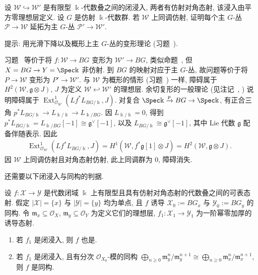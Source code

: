 \begin{exercise}\label{src:7.7.14}
设 $\mathcal W\hookrightarrow\mathcal W'$ 是有限型 $\Bbbk$-代数叠之间的闭浸入, 两者有仿射对角态射, 该浸入由平方零理想层定义. 设 $G$ 是仿射 $\Bbbk$-代数群. 若 $\mathcal W$ 上同调仿射, 证明每个主 $G$-丛 $\mathcal P\to\mathcal W$ 延拓为主 $G$-丛 $\mathcal P'\to\mathcal W'$.

提示: 用光滑下降以及概形上主 $G$-丛的变形理论 (习题~).
\end{exercise}
\begin{remark}\label{src:7.7.15}
习题~ 等价于将 $f:\mathcal W\to BG$ 变形为 $\mathcal W'\to BG$, 类似命题~, 但 $\mathcal X=BG\to\mathcal Y=\Spec\Bbbk$ 非仿射. 到 $BG$ 的映射对应于主 $G$-丛, 故问题等价于将 $P\to\mathcal W$ 变形为 $P'\to\mathcal W'$. 与 $\mathcal W$ 为概形的情形 (习题~) 一样, 障碍属于 $H^2(\mathcal W,\mathfrak g\otimes J)$, $J$ 为定义 $\mathcal W\hookleftarrow\mathcal W'$ 的理想层. 余切复形的一般理论 (见注记~, ) 说明障碍属于 $\operatorname{Ext}^1_{\mathcal O_{\mathcal W}}(Lf^*L_{BG/\Bbbk},J)$. 对复合 $\Spec\Bbbk\xrightarrow pBG\to\Spec\Bbbk$, 有正合三角 $p^*L_{BG/\Bbbk}\to L_{\Bbbk/\Bbbk}\to L_{\Bbbk/BG}$. 因 $L_{\Bbbk/\Bbbk}=0$, 得到 $p^*L_{BG/\Bbbk}=L_{\Bbbk/BG}[-1]\cong\mathfrak g^\vee[-1]$, 以及 $L_{BG/\Bbbk}\cong\mathfrak g^\vee[-1]$, 其中 Lie 代数 $\mathfrak g$ 配备伴随表示. 因此
\begin{align*}
\operatorname{Ext}^1_{\mathcal O_{\mathcal W}}(Lf^*L_{BG/\Bbbk},J)=H^1(\mathcal W,f^*\mathfrak g[1]\otimes J)=H^2(\mathcal W,\mathfrak g\otimes J).
\end{align*}
因 $\mathcal W$ 上同调仿射且对角态射仿射, 此上同调群为 $0$, 障碍消失.
\end{remark}
还需要以下闭浸入与同构的判据.
\begin{lemma}\label{src:7.7.16}
设 $f:\mathcal X\to\mathcal Y$ 是代数闭域 $\Bbbk$ 上有限型且具有仿射对角态射的代数叠之间的可表态射. 假定 $|\mathcal X|=\{x\}$ 与 $|\mathcal Y|=\{y\}$ 均为单点, 且 $f$ 诱导 $\mathcal X_0:=BG_x$ 与 $\mathcal Y_0:=BG_y$ 的同构. 令 $\mathfrak m_x\subseteq\mathcal O_X$, $\mathfrak m_y\subseteq\mathcal O_Y$ 为定义它们的理想层, $f_1:\mathcal X_1\to\mathcal Y_1$ 为一阶幂零加厚的诱导态射.
\begin{enumerate}[(1)]
\item 若 $f_1$ 是闭浸入, 则 $f$ 也是.
\item 若 $f_1$ 是闭浸入, 且有分次 $\mathcal O_{X_0}$-模的同构 $\bigoplus_{n\ge0}\mathfrak m_y^n/\mathfrak m_y^{n+1}\cong\bigoplus_{n\ge0}\mathfrak m_x^n/\mathfrak m_x^{n+1}$, 则 $f$ 是同构.
\end{enumerate}
\end{lemma}
